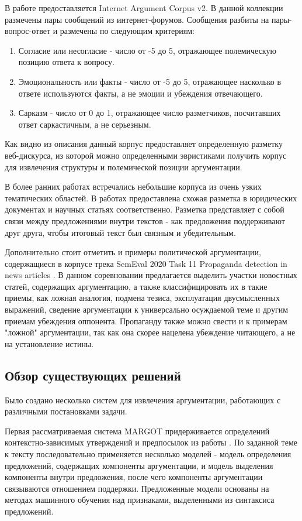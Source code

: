 В работе \cite{abbott2016internet} предоставляется Internet Argument Corpus v2. В данной коллекции размечены пары сообщений из интернет-форумов. Сообщения разбиты на пары-вопрос-ответ и размечены по следующим критериям:
\begin{enumerate}
    \item Согласие или несогласие - число от -5 до 5, отражающее полемическую позицию ответа к вопросу.
    \item Эмоциональность или факты - число от -5 до 5, отражающее насколько в ответе используются факты, а не эмоции и убеждения отвечающего.
    \item Сарказм - число от 0 до 1, отражающее число разметчиков, посчитавших ответ саркастичным, а не серьезным.
\end{enumerate}
Как видно из описания данный корпус предоставляет определенную разметку веб-дискурса, из которой можно определенными эвристиками получить корпус для извлечения структуры и полемической позиции аргументации.

В более ранних работах встречались небольшие корпуса из очень узких тематических областей. В работах \cite{palau2009argumentation, ronzano2015dr} предоставлена схожая разметка в юридических документах и научных статьях соответственно. Разметка представляет с собой связи между предложениями внутри текстов - как предложения поддерживают друг друга, чтобы итоговый текст был связным и убедительным. 

Дополнительно стоит отметить и примеры политической аргументации, содержащиеся в корпусе трека SemEval 2020 Task 11 Propaganda detection in news articles \cite{da2020semeval}. В данном соревновании предлагается выделить участки новостных статей, содержащих аргументацию, а также классифицировать их в такие приемы, как ложная аналогия, подмена тезиса, эксплуатация двусмысленных выражений, сведение аргументации к универсально осуждаемой теме и другим приемам убеждения оппонента. Пропаганду также можно свести и к примерам "ложной" аргументации, так как она скорее нацелена убеждение читающего, а не на установление истины.

\subsection{Обзор существующих решений}

Было создано несколько систем для извлечения аргументации, работающих с различными постановками задачи.

Первая  рассматриваемая система MARGOT \cite{lippi2016margot} придерживается определений контекстно-зависимых утверждений и предпосылок из работы \cite{aharoni2014benchmark}. По заданной теме к тексту последовательно применяется несколько моделей - модель определения предложений, содержащих компоненты аргументации, и модель выделения компоненты внутри предложения, после чего компоненты аргументации связываются отношением поддержки. Предложенные модели основаны на методах машинного обучения над признаками, выделенными из синтаксиса предложений.

